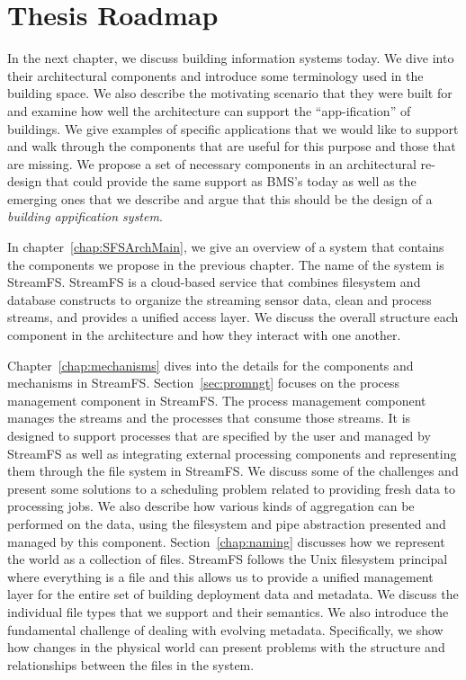 \section{Thesis Roadmap}
In the next chapter, we discuss building information systems today.  We dive into their architectural components and introduce some terminology
used in the building space.  We also describe the motivating scenario that they were built for and examine how well the architecture 
can support the ``app-ification'' of buildings.  We give examples of specific applications that we would like to support
and walk through the components that are useful for this purpose and those that are missing.  We propose a set of necessary
components in an architectural re-design that could provide the same support as BMS's today as well as the emerging ones that we
describe and argue that this should be the design of a \emph{building appification system}.

In chapter~\ref{chap:SFSArchMain}, we give an overview of a system that contains the components we propose in the previous
chapter.  The name of the system is StreamFS.  StreamFS is a cloud-based service that combines filesystem and database constructs
to organize the streaming sensor data, clean and process streams, and provides a unified access layer.
We discuss the overall structure each component in the architecture and how they interact with one another.

Chapter~\ref{chap:mechanisms} dives into the details for the components and mechanisms in StreamFS.
Section~\ref{sec:promngt} focuses on the process management component in StreamFS.  The process management component
manages the streams and the processes that consume those streams.  It is designed to support processes that are specified by the user
and managed by StreamFS as well as integrating external processing components and representing them through the file system in StreamFS.
We discuss some of the challenges and present some solutions to a scheduling problem related to providing fresh data  to processing jobs.
We also describe how various kinds of aggregation can be performed on the data, using the filesystem and pipe abstraction
presented and managed by this component.
Section~\ref{chap:naming} discusses how we represent the world as a collection of files.  StreamFS follows the Unix filesystem principal 
where everything is a file and this allows us to provide a unified management layer for the entire set of building deployment
data and metadata.  We discuss the individual file types that we support and their semantics.  We also introduce the fundamental
challenge of dealing with evolving metadata.  Specifically,  we show how changes in the physical world can present problems
with the structure and relationships between the files in the system.  

